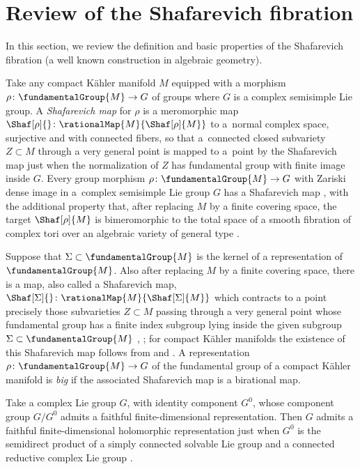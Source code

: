 \section{Review of the Shafarevich fibration}\label{section:Shafarevich}
In this section, we review the definition and basic properties of the Shafarevich fibration (a well known construction in algebraic geometry).

Take any compact K\"ahler manifold $M$ equipped with a morphism $\rho \colon \fundamentalGroup{M} \to G$ of groups where $G$ is a complex semisimple Lie group.
A \emph{Shafarevich map} for $\rho$ is a meromorphic map~${\Shaf[\rho]{} \colon \rationalMap{M}{\Shaf[\rho]{M}}}$ to a~normal complex space, surjective and with connected fibers, so that a~connected closed subvariety $Z \subset M$ through a very general point is mapped to a~point by the Shafarevich map just when the normalization of $Z$ has fundamental group with finite image inside $G$.
Every group morphism $\rho \colon \fundamentalGroup{M} \to G$ with Zariski dense image in a~complex semisimple Lie group $G$ has a Shafarevich map \cite[Definition~2.13]{Campana/Claudon/Eyssidieux:2015}, \cite[p.~105]{Zuo:1999} with the additional property that, after replacing $M$ by a finite covering space, the target $\Shaf[\rho]{M}$ is bimeromorphic to the total space of a smooth fibration of complex tori over an algebraic variety of general type \cite[Theorem~4]{Campana/Claudon/Eyssidieux:2015}.

Suppose that $\Sigma \subset \fundamentalGroup{M}$ is the kernel of a representation of $\fundamentalGroup{M}$.
Also after replacing $M$ by a finite covering space, there is a map, also called a Shafarevich map,
$
\Shaf[\Sigma]{} \colon \rationalMap{M}{\Shaf[\Sigma]{M}}
$
which contracts to a point precisely those subvarieties $Z \subset M$ passing through a very general point whose fundamental group has a finite index subgroup lying inside the given subgroup $\Sigma \subset \fundamentalGroup{M}$ \cite[Theorem 1.3]{Katzarkov:1999}, \cite{Katzarkov:1997}; for compact K\"ahler manifolds the existence of this Shafarevich map follows
from \cite[Theorem 4]{Campana/Claudon/Eyssidieux:2015} and \cite{Katzarkov:1997}.
A representation $\rho \colon \fundamentalGroup{M} \to G$ of the fundamental group of a compact K\"ahler manifold is \emph{big} if the associated Shafarevich map is a birational map.

Take a complex Lie group $G$, with identity component $G^0$, whose component group $G/G^0$ admits a faithful finite-dimensional representation.
Then $G$ admits a faithful finite-dimensional holomorphic representation just when $G^0$ is the semidirect product of a simply connected solvable Lie group and a connected reductive complex
Lie group \cite[Theorem~16.3.7]{Hilgert.Neeb:2012}.

